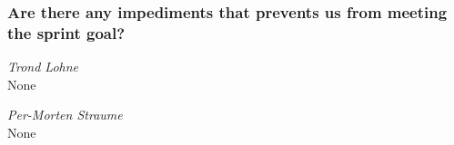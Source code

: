 \documentclass{article}
\begin{document}
\subsubsection*{Are there any impediments that prevents us from meeting the sprint goal?}

\noindent\textit{Trond Lohne}\\
None

\medskip

\noindent\textit{Per-Morten Straume}\\
None
\end{document}
